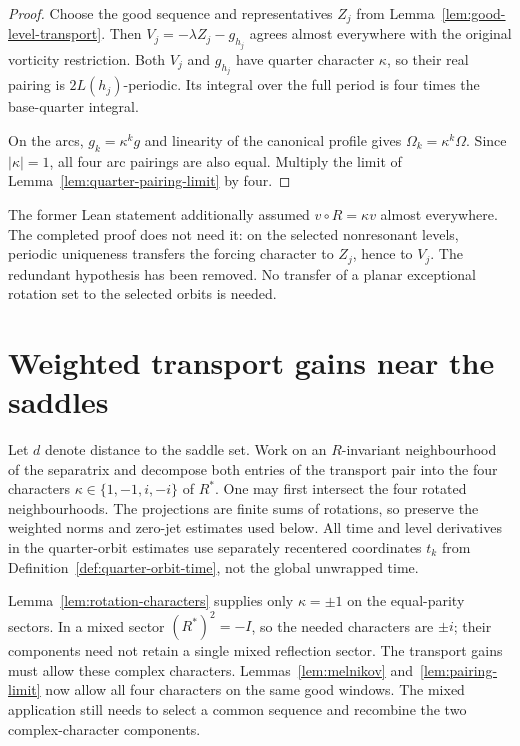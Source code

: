 \begin{proof}
\leanok
Choose the good sequence and representatives $Z_j$ from
Lemma~\ref{lem:good-level-transport}. Then
$V_j=-\lambda Z_j-g_{h_j}$ agrees almost everywhere with the original
vorticity restriction. Both $V_j$ and $g_{h_j}$ have quarter character
$\kappa$, so their real pairing is $2L(h_j)$-periodic. Its integral over
the full period is four times the base-quarter integral.

On the arcs, $g_k=\kappa^k g$ and linearity of the canonical profile gives
$\Omega_k=\kappa^k\Omega$. Since $|\kappa|=1$, all four arc pairings are
also equal. Multiply the limit of Lemma~\ref{lem:quarter-pairing-limit} by four.
\end{proof}

\begin{remark}
The former Lean statement additionally assumed $v\circ R=\kappa v$ almost everywhere.
The completed proof does not need it: on the selected nonresonant levels, periodic
uniqueness transfers the forcing character to $Z_j$, hence to $V_j$.
The redundant hypothesis has been removed. No transfer of a planar exceptional
rotation set to the selected orbits is needed.
\end{remark}

\section{Weighted transport gains near the saddles}

Let $d$ denote distance to the saddle set. Work on an $R$-invariant
neighbourhood of the separatrix and decompose both entries of the transport
pair into the four characters $\kappa\in\{1,-1,i,-i\}$ of $R^*$.
One may first intersect the four rotated neighbourhoods.
The projections are finite sums of rotations, so preserve the weighted
norms and zero-jet estimates used below. All time and level derivatives in
the quarter-orbit estimates use separately recentered coordinates $t_k$ from
Definition~\ref{def:quarter-orbit-time}, not the global unwrapped time.

\begin{remark}
Lemma~\ref{lem:rotation-characters} supplies only $\kappa=\pm1$ on the
equal-parity sectors. In a mixed sector $(R^*)^2=-I$, so the needed
characters are $\pm i$; their components need not retain a single mixed
reflection sector. The transport gains must allow these complex characters.
Lemmas~\ref{lem:melnikov} and~\ref{lem:pairing-limit} now allow all four
characters on the same good windows. The mixed application still needs to
select a common sequence and recombine the two complex-character components.
\end{remark}

